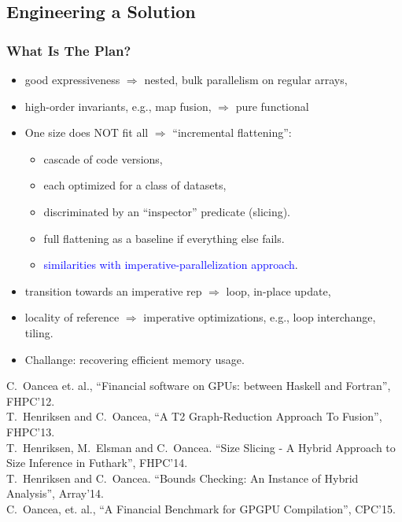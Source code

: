 \documentclass{beamer}
\newcommand{\blue}[1]{\textcolor{Blue}{{#1}}}
\newcommand{\emp}[1]{\textcolor{DikuRed}{ #1}}
\begin{document}
\subsection{Engineering a Solution}

\begin{frame}[fragile,t]
  \frametitle{What Is The Plan?}

\begin{itemize}
    \item good expressiveness $\Rightarrow$ \emp{nested}, 
                bulk parallelism on regular arrays,\smallskip
    \item high-order invariants, e.g., \emp{map fusion}, 
                $\Rightarrow$ \emp{pure functional}\smallskip
    \item One size does NOT fit all $\Rightarrow$ \emp{``incremental flattening''}:
            \begin{itemize} 
                \item cascade of code versions,
                \item each optimized for a class of datasets,
                \item discriminated by an ``inspector'' predicate (slicing).
                \item full flattening as a baseline if everything else fails.
                \item \blue{similarities with imperative-parallelization approach}.
            \end{itemize}\smallskip

    \item transition towards an imperative rep $\Rightarrow$
                \emp{loop, in-place update},
    \item locality of reference $\Rightarrow$ \emp{imperative optimizations}, 
                    e.g., loop interchange, tiling.\medskip

    \item Challange: recovering efficient memory usage.

\end{itemize}

\smallskip

\tiny{C.~Oancea et. al., ``Financial software on GPUs: between Haskell and Fortran'', FHPC'12.\\
T.~Henriksen and C.~Oancea, ``A T2 Graph-Reduction Approach To Fusion'', FHPC'13.\\
T.~Henriksen, M.~Elsman and C.~Oancea. ``Size Slicing - A Hybrid Approach to Size Inference in Futhark'', FHPC'14.\\
T.~Henriksen and C.~Oancea. ``Bounds Checking: An Instance of Hybrid Analysis'', Array'14.\\
C.~Oancea, et. al., ``A Financial Benchmark for GPGPU Compilation'', CPC'15.
}

\end{frame}
\end{document}
